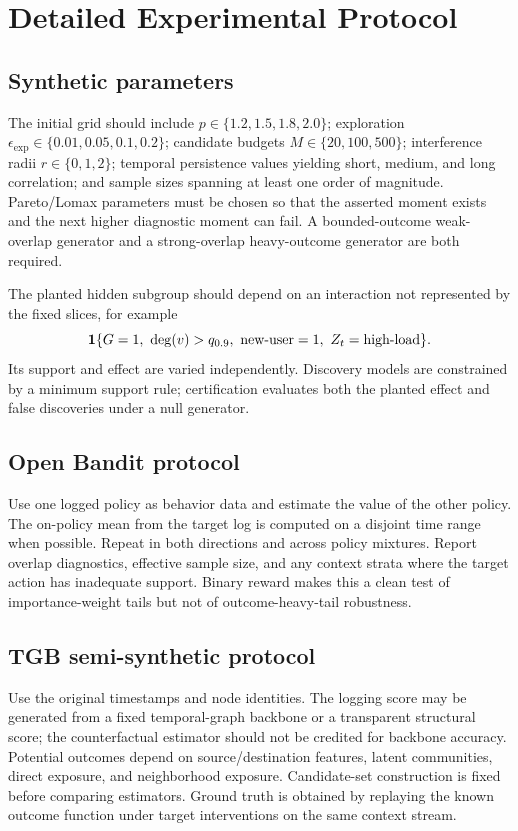\section{Detailed Experimental Protocol}
\label{app:experiments}

\subsection{Synthetic parameters}
The initial grid should include $p\in\{1.2,1.5,1.8,2.0\}$; exploration $\epsilon_{\mathrm{exp}}\in\{0.01,0.05,0.1,0.2\}$; candidate budgets $M\in\{20,100,500\}$; interference radii $r\in\{0,1,2\}$; temporal persistence values yielding short, medium, and long correlation; and sample sizes spanning at least one order of magnitude. Pareto/Lomax parameters must be chosen so that the asserted moment exists and the next higher diagnostic moment can fail. A bounded-outcome weak-overlap generator and a strong-overlap heavy-outcome generator are both required.

The planted hidden subgroup should depend on an interaction not represented by the fixed slices, for example
\begin{equation}
\ind\{G=1,\ \deg(v)>q_{0.9},\ \text{new-user}=1,\ Z_t=\text{high-load}\}.
\end{equation}
Its support and effect are varied independently. Discovery models are constrained by a minimum support rule; certification evaluates both the planted effect and false discoveries under a null generator.

\subsection{Open Bandit protocol}
Use one logged policy as behavior data and estimate the value of the other policy. The on-policy mean from the target log is computed on a disjoint time range when possible. Repeat in both directions and across policy mixtures. Report overlap diagnostics, effective sample size, and any context strata where the target action has inadequate support. Binary reward makes this a clean test of importance-weight tails but not of outcome-heavy-tail robustness.

\subsection{TGB semi-synthetic protocol}
Use the original timestamps and node identities. The logging score may be generated from a fixed temporal-graph backbone or a transparent structural score; the counterfactual estimator should not be credited for backbone accuracy. Potential outcomes depend on source/destination features, latent communities, direct exposure, and neighborhood exposure. Candidate-set construction is fixed before comparing estimators. Ground truth is obtained by replaying the known outcome function under target interventions on the same context stream.

